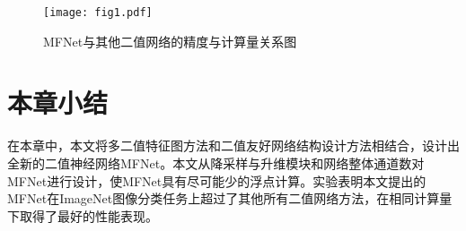 \begin{figure}[htb]
  \centering
  \texttt{[image: fig1.pdf]}
  \caption{MFNet与其他二值网络的精度与计算量关系图}
  \label{fig:acc}
\end{figure}

\section{本章小结}

在本章中，本文将多二值特征图方法和二值友好网络结构设计方法相结合，设计出全新的二值神经网络MFNet。本文从降采样与升维模块和网络整体通道数对MFNet进行设计，使MFNet具有尽可能少的浮点计算。实验表明本文提出的MFNet在ImageNet图像分类任务上超过了其他所有二值网络方法，在相同计算量下取得了最好的性能表现。